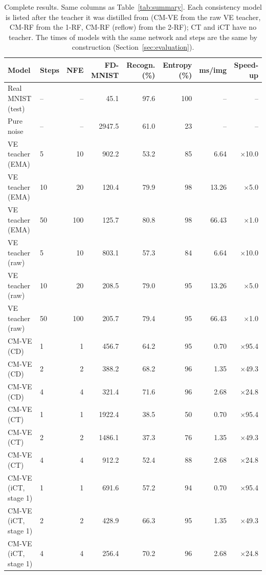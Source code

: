\documentclass{article}
\begin{document}
\begin{table}[!htbp]
  \caption{Complete results. Same columns as Table~\ref{tab:summary}. Each
  consistency model is listed after the teacher it was distilled from (CM-VE
  from the raw VE teacher, CM-RF from the 1-RF, CM-RF (reflow) from the 2-RF);
  CT and iCT have no teacher. The times of models with the same network and
  steps are the same by construction (Section~\ref{sec:evaluation}).}
  \label{tab:full}
  \centering
  \footnotesize
  \setlength{\tabcolsep}{4pt}
  \begin{tabular}{llrrrrrr}
    \toprule
    Model & Steps & NFE & FD-MNIST & Recogn. (\%) & Entropy (\%) & ms/img & Speed-up \\
    \midrule
    Real MNIST (test) & -- & -- & 45.1 & 97.6 & 100 & -- & -- \\
    Pure noise & -- & -- & 2947.5 & 61.0 & 23 & -- & -- \\
    \midrule
    VE teacher (EMA) & 5 & 10 & 902.2 & 53.2 & 85 & 6.64 & $\times$10.0 \\
    VE teacher (EMA) & 10 & 20 & 120.4 & 79.9 & 98 & 13.26 & $\times$5.0 \\
    VE teacher (EMA) & 50 & 100 & 125.7 & 80.8 & 98 & 66.43 & $\times$1.0 \\
    VE teacher (raw) & 5 & 10 & 803.1 & 57.3 & 84 & 6.64 & $\times$10.0 \\
    VE teacher (raw) & 10 & 20 & 208.5 & 79.0 & 95 & 13.26 & $\times$5.0 \\
    VE teacher (raw) & 50 & 100 & 205.7 & 79.4 & 95 & 66.43 & $\times$1.0 \\
    \midrule
    CM-VE (CD) & 1 & 1 & 456.7 & 64.2 & 95 & 0.70 & $\times$95.4 \\
    CM-VE (CD) & 2 & 2 & 388.2 & 68.2 & 96 & 1.35 & $\times$49.3 \\
    CM-VE (CD) & 4 & 4 & 321.4 & 71.6 & 96 & 2.68 & $\times$24.8 \\
    \midrule
    CM-VE (CT) & 1 & 1 & 1922.4 & 38.5 & 50 & 0.70 & $\times$95.4 \\
    CM-VE (CT) & 2 & 2 & 1486.1 & 37.3 & 76 & 1.35 & $\times$49.3 \\
    CM-VE (CT) & 4 & 4 & 912.2 & 52.4 & 88 & 2.68 & $\times$24.8 \\
    \midrule
    CM-VE (iCT, stage 1) & 1 & 1 & 691.6 & 57.2 & 94 & 0.70 & $\times$95.4 \\
    CM-VE (iCT, stage 1) & 2 & 2 & 428.9 & 66.3 & 95 & 1.35 & $\times$49.3 \\
    CM-VE (iCT, stage 1) & 4 & 4 & 256.4 & 70.2 & 96 & 2.68 & $\times$24.8 \\

\end{tabular}
\end{table}
\end{document}
